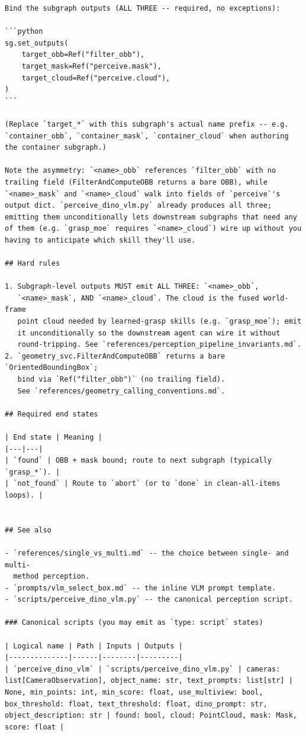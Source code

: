 \begin{lstlisting}
Bind the subgraph outputs (ALL THREE -- required, no exceptions):

```python
sg.set_outputs(
    target_obb=Ref("filter_obb"),
    target_mask=Ref("perceive.mask"),
    target_cloud=Ref("perceive.cloud"),
)
```

(Replace `target_*` with this subgraph's actual name prefix -- e.g.
`container_obb`, `container_mask`, `container_cloud` when authoring
the container subgraph.)

Note the asymmetry: `<name>_obb` references `filter_obb` with no
trailing field (FilterAndComputeOBB returns a bare OBB), while
`<name>_mask` and `<name>_cloud` walk into fields of `perceive`'s
output dict. `perceive_dino_vlm.py` already produces all three;
emitting them unconditionally lets downstream subgraphs that need any
of them (e.g. `grasp_moe` requires `<name>_cloud`) wire up without you
having to anticipate which skill they'll use.

## Hard rules

1. Subgraph-level outputs MUST emit ALL THREE: `<name>_obb`,
   `<name>_mask`, AND `<name>_cloud`. The cloud is the fused world-frame
   point cloud needed by learned-grasp skills (e.g. `grasp_moe`); emit
   it unconditionally so the downstream agent can wire it without
   round-tripping. See `references/perception_pipeline_invariants.md`.
2. `geometry_svc.FilterAndComputeOBB` returns a bare `OrientedBoundingBox`;
   bind via `Ref("filter_obb")` (no trailing field).
   See `references/geometry_calling_conventions.md`.

## Required end states

| End state | Meaning |
|---|---|
| `found` | OBB + mask bound; route to next subgraph (typically `grasp_*`). |
| `not_found` | Route to `abort` (or to `done` in clean-all-items loops). |


## See also

- `references/single_vs_multi.md` -- the choice between single- and multi-
  method perception.
- `prompts/vlm_select_box.md` -- the inline VLM prompt template.
- `scripts/perceive_dino_vlm.py` -- the canonical perception script.

### Canonical scripts (you may emit as `type: script` states)

| Logical name | Path | Inputs | Outputs |
|--------------|------|--------|---------|
| `perceive_dino_vlm` | `scripts/perceive_dino_vlm.py` | cameras: list[CameraObservation], object_name: str, text_prompts: list[str] | None, min_points: int, min_score: float, use_multiview: bool, box_threshold: float, text_threshold: float, dino_prompt: str, object_description: str | found: bool, cloud: PointCloud, mask: Mask, score: float |


\end{lstlisting}
